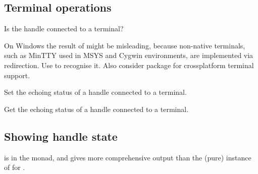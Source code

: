 \subsection{Terminal operations}
\begin{haddockdesc}
\item[\begin{tabular}{@{}l}
hIsTerminalDevice :: Handle -> IO Bool
\end{tabular}]
{\haddockbegindoc
Is the handle connected to a terminal?\par
On Windows the result of  might be misleading,
 because non-native terminals, such as MinTTY used in MSYS and Cygwin environments,
 are implemented via redirection.
 Use 
 to recognise it. Also consider  package for crossplatform terminal
 support.\par}
\end{haddockdesc}
\begin{haddockdesc}
\item[\begin{tabular}{@{}l}
hSetEcho :: Handle -> Bool -> IO ()
\end{tabular}]
{\haddockbegindoc
Set the echoing status of a handle connected to a terminal.\par}
\end{haddockdesc}
\begin{haddockdesc}
\item[\begin{tabular}{@{}l}
hGetEcho :: Handle -> IO Bool
\end{tabular}]
{\haddockbegindoc
Get the echoing status of a handle connected to a terminal.\par}
\end{haddockdesc}
\subsection{Showing handle state}
\begin{haddockdesc}
\item[\begin{tabular}{@{}l}
hShow :: Handle -> IO String
\end{tabular}]
{\haddockbegindoc
{} is in the  monad, and gives more comprehensive output
 than the (pure) instance of  for .\par}
\end{haddockdesc}
